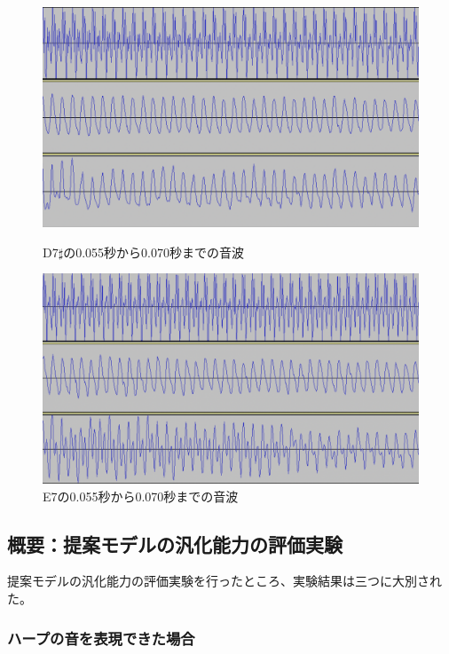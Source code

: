 \begin{figure}[b]
\centering
\begin{minipage}{0.48\columnwidth}
\centering
\includegraphics[width=0.9\columnwidth]{figure/88_88_det/d7s_0550_0700.png}
\caption[D7$\sharp$の音波]{D7$\sharp$の0.055秒から0.070秒までの音波}
\label{fig:88_88_bad1}
\end{minipage}
\begin{minipage}{0.48\columnwidth}
\centering
\includegraphics[width=0.9\columnwidth]{figure/88_88_det/e7_0550_0700.png}
\caption[E7の音波]{E7の0.055秒から0.070秒までの音波}
\label{fig:88_88_bad2}
\end{minipage}
\end{figure}

\subsection{概要：提案モデルの汎化能力の評価実験}

提案モデルの汎化能力の評価実験を行ったところ、実験結果は三つに大別された。

\subsubsection{ハープの音を表現できた場合}

